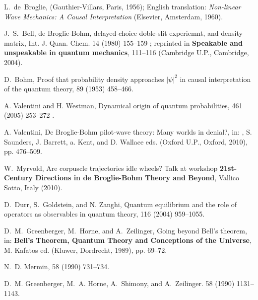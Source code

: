 \documentclass[12pt,preprint,tightenlines]{elsarticle}
\begin{document}
\begin{thebibliography}{40}
L.~de~Broglie,
\newblock (Gauthier-Villars, Paris, 1956);
\newblock English translation: {\em Non-linear Wave Mechanics: A Causal
  Interpretation} (Elsevier, Amsterdam, 1960).

J.~S.~Bell,
\newblock de Broglie-Bohm, delayed-choice doble-slit experiemnt, and density matrix,
\newblock Int. J. Quan. Chem.  14 (1980) 155--159 ;
 \newblock reprinted in {\bf Speakable and unspeakable in quantum mechanics}, 111--116  (Cambridge U.P., Cambridge, 2004).

D.~Bohm,
\newblock Proof that probability density approaches $|\psi|^{2}$ in causal
  interpretation of the quantum theory,
   89  (1953) 458--466.

A. Valentini and H. Westman,
\newblock Dynamical origin of quantum probabilities,
  461 (2005) 253--272 .

A. Valentini,
\newblock De Broglie-Bohm pilot-wave theory: Many worlds in denial?, in:
,  S. Saunders, J. Barrett, a. Kent, and D. Wallace eds. (Oxford U.P., Oxford, 2010), pp. 476--509.


W.~Myrvold,
\newblock Are corpuscle trajectories idle wheels?
\newblock Talk at workshop {\bf 21st-Century
  Directions in de Broglie-Bohm Theory and Beyond}, Vallico Sotto,
  Italy (2010).

D.~Durr, S.~Goldstein, and N. Zanghi,
\newblock Quantum equilibrium and the role of operators as observables in
  quantum theory,
  116  (2004) 959--1055.

D.~M.~Greenberger, M.~Horne, and A.~Zeilinger,
\newblock Going beyond Bell's theorem, in: {\bf Bell's Theorem, Quantum Theory
  and Conceptions of the Universe},   M. Kafatos ed. (Kluwer, Dordrecht, 1989), pp. 69--72.


N.~D. Mermin,
 58 (1990) 731--734.

D.~M. Greenberger, M.~A. Horne, A.~Shimony, and A.~Zeilinger.
  58 (1990) 1131--1143.


\end{thebibliography}
\end{document}
